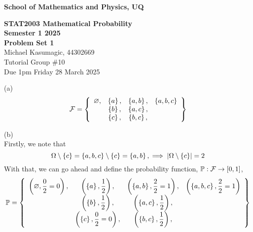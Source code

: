 \documentclass[a4paper,12pt]{report}
\begin{document}
\begin{center}
{\bf School of Mathematics and Physics, UQ}
\end{center}
\begin{center}
	{\large\bf STAT2003 Mathematical Probability \\ Semester 1 2025 \\ Problem Set 1} \\ \vspace{1em}
	Michael Kasumagic, 44302669 \\
	Tutorial Group \#10 \\
	Due 1pm Friday 28 March 2025
\end{center}

\sol (a)
$$
  \mathcal{F} = \left\lbrace 
    \begin{array}{cccc}
      \varnothing, & \left\lbrace a \right\rbrace,& \left\lbrace a,b \right\rbrace,& \left\lbrace a,b,c \right\rbrace  \\
            & \left\lbrace b \right\rbrace,& \left\lbrace a,c \right\rbrace,&                 \\
            & \left\lbrace c \right\rbrace,& \left\lbrace b,c \right\rbrace,&                 \\
    \end{array}
   \right\rbrace
$$

\sol (b) \\
Firstly, we note that
$$
    \Omega\setminus\left\lbrace c \right\rbrace = \left\lbrace a,b,c \right\rbrace\setminus\left\lbrace c \right\rbrace = \left\lbrace a,b \right\rbrace,\implies\left| \Omega\setminus\left\lbrace c \right\rbrace \right| = 2
$$
With that, we can go ahead and define the probability function, $\mathbb{P}:\mathcal{F}\to\left[ 0,1 \right]$,
$$
  \mathbb{P} = \left\lbrace 
    \begin{array}{cccc}
      \left( \varnothing, \dfrac{0}{2}=0 \right), & \left( \left\lbrace a \right\rbrace, \dfrac{1}{2} \right), & \left( \left\lbrace a,b \right\rbrace, \dfrac{2}{2}=1 \right), & \left( \left\lbrace a,b,c \right\rbrace, \dfrac{2}{2}=1 \right)  \\
                        & \left( \left\lbrace b \right\rbrace, \dfrac{1}{2} \right), & \left( \left\lbrace a,c \right\rbrace, \dfrac{1}{2} \right), &                             \\
                        & \left( \left\lbrace c \right\rbrace, \dfrac{0}{2}=0 \right), & \left( \left\lbrace b,c \right\rbrace, \dfrac{1}{2} \right), &                             \\
    \end{array}
   \right\rbrace
$$
\end{document}
